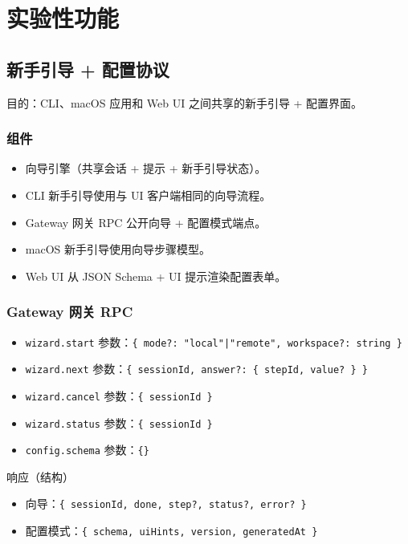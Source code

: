 \chapter{实验性功能}

\section{新手引导 + 配置协议}


目的：CLI、macOS 应用和 Web UI 之间共享的新手引导 + 配置界面。

\subsection{组件}


\begin{itemize}
  \item 向导引擎（共享会话 + 提示 + 新手引导状态）。
  \item CLI 新手引导使用与 UI 客户端相同的向导流程。
  \item Gateway 网关 RPC 公开向导 + 配置模式端点。
  \item macOS 新手引导使用向导步骤模型。
  \item Web UI 从 JSON Schema + UI 提示渲染配置表单。
\end{itemize}


\subsection{Gateway 网关 RPC}


\begin{itemize}
  \item \texttt{wizard.start} 参数：\texttt{\{ mode?: "local"|"remote", workspace?: string \}}
  \item \texttt{wizard.next} 参数：\texttt{\{ sessionId, answer?: \{ stepId, value? \} \}}
  \item \texttt{wizard.cancel} 参数：\texttt{\{ sessionId \}}
  \item \texttt{wizard.status} 参数：\texttt{\{ sessionId \}}
  \item \texttt{config.schema} 参数：\texttt{\{\}}
\end{itemize}


响应（结构）

\begin{itemize}
  \item 向导：\texttt{\{ sessionId, done, step?, status?, error? \}}
  \item 配置模式：\texttt{\{ schema, uiHints, version, generatedAt \}}
\end{itemize}



